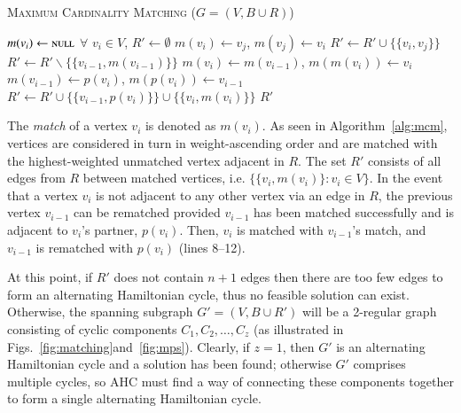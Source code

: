 \documentclass[authoryear]{elsarticle}
\begin{document}
\begin{algorithm}
\caption{\textsc{Maximum Cardinality Matching} ($G = (V, B \cup R)$)}
\begin{algorithmic}[1]
	\State $m(v_i) \gets \textsc{null}$ $\forall$ $v_i \in V$, $R' \gets \emptyset$
				\State $m(v_i) \gets v_j$, $m(v_j) \gets v_i$
				\State $R' \gets R' \cup \{\{v_i, v_j\}\}$
				\Break
			\EndIf
		\EndFor
			\State $R' \gets R' \backslash \{\{v_{i-1}, m(v_{i-1})\}\}$
			\State $m(v_i) \gets m(v_{i-1})$, $m(m(v_i)) \gets v_i$
			\State $m(v_{i-1}) \gets p(v_i)$, $m(p(v_i)) \gets v_{i-1}$
			\State $R' \gets R' \cup \{\{v_{i-1}, p(v_i)\}\} \cup \{\{v_i, m(v_i)\}\}$
		\EndIf
	\EndFor
	\Return $R'$
\end{algorithmic}
\label{alg:mcm}	
\end{algorithm}

\noindent The \emph{match} of a vertex $v_i$ is denoted as $m(v_i)$. As seen in Algorithm~\ref{alg:mcm}, vertices are considered in turn in weight-ascending order and are matched with the highest-weighted unmatched vertex adjacent in $R$. The set $R'$ consists of all edges from $R$ between matched vertices, i.e. $\{\{v_i, m(v_i)\} : v_i \in V \}$. In the event that a vertex $v_i$ is not adjacent to any other vertex via an edge in $R$, the previous vertex $v_{i-1}$ can be rematched provided $v_{i-1}$ has been matched successfully and is adjacent to $v_i$'s partner, $p(v_i)$. Then, $v_i$ is matched with $v_{i-1}$'s match, and $v_{i-1}$ is rematched with $p(v_i)$ (lines 8--12).

At this point, if $R'$ does not contain $n+1$ edges then there are too few edges to form an alternating Hamiltonian cycle, thus no feasible solution can exist. Otherwise, the spanning subgraph $G'=(V, B \cup R')$ will be a 2-regular graph consisting of cyclic components $C_1,C_2,\dotsc,C_z$ (as illustrated in Figs.~\ref{fig:matching}and~\ref{fig:mps}). Clearly, if $z = 1$, then $G'$ is an alternating Hamiltonian cycle and a solution has been found; otherwise $G'$ comprises multiple cycles, so AHC must find a way of connecting these components together to form a single alternating Hamiltonian cycle.
\end{document}
